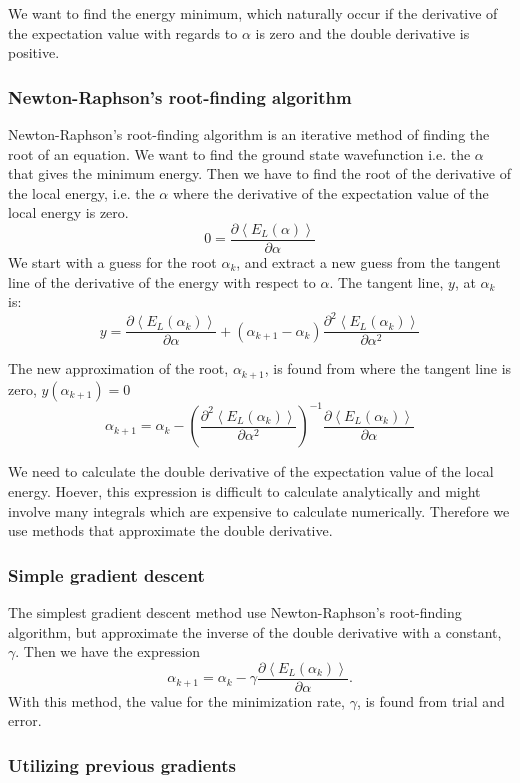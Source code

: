 We want to find the energy minimum, which naturally occur if the derivative of the expectation value with regards to $\alpha$ is zero and the double derivative is positive.
\subsubsection{Newton-Raphson's root-finding algorithm}
Newton-Raphson's root-finding algorithm is an iterative method of finding the root of an equation. We want to find the ground state wavefunction i.e. the $\alpha$ that gives the minimum energy. Then we have to find the root of the derivative of the local energy, i.e. the $\alpha$ where the derivative of the expectation value of the local energy is zero.
$$ 0 = \frac{\partial \left<E_L(\alpha)\right>}{\partial \alpha}$$
We start with a guess for the root $\alpha_k$, and extract a new guess from the tangent line of the derivative of the energy with respect to $\alpha$. The tangent line, $y$, at $\alpha_k$ is:
$$y = \frac{\partial \left<E_L(\alpha_k)\right>}{\partial \alpha} + (\alpha_{k+1} - \alpha_k) \frac{\partial^2 \left<E_L(\alpha_k)\right>}{\partial \alpha^2}$$

The new approximation of the root, $\alpha_{k+1}$, is found from where the tangent line is zero, $y(\alpha_{k+1})=0$
$$ \alpha_{k+1} =  \alpha_k - \left(\frac{\partial^2 \left<E_L(\alpha_k)\right>}{\partial \alpha^2}\right)^{-1}\frac{\partial \left<E_L(\alpha_k)\right>}{\partial \alpha} $$

We need to calculate the double derivative of the expectation value of the local energy. Hoever, this expression is difficult to calculate analytically and might involve many integrals which are expensive to calculate numerically. Therefore we use methods that approximate the double derivative. 

\subsubsection{Simple gradient descent}\label{sec:gradient}
The simplest gradient descent method use Newton-Raphson's root-finding algorithm, but approximate the inverse of the double derivative with a constant, $\gamma$. Then we have the expression
$$ \alpha_{k+1} =  \alpha_k - \gamma \frac{\partial \left<E_L(\alpha_k)\right>}{\partial \alpha}. $$
With this method, the value for the minimization rate, $\gamma$, is found from trial and error.

\subsubsection{Utilizing previous gradients}\label{sec:gradient2}

